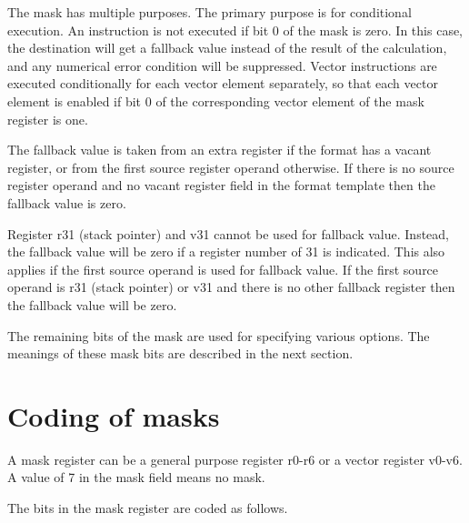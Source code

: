 \documentclass[forwardcom.tex]{subfiles}
\begin{document}
The mask has multiple purposes. The primary purpose is for conditional execution. An instruction is not executed if bit 0 of the mask is zero. In this case, the destination will get a fallback value instead of the result of the calculation, and any numerical error condition will be suppressed. Vector instructions are executed conditionally for each vector element separately, so that each vector element is enabled if bit 0 of the corresponding vector element of the mask register is one.
\vspace{2mm}

The fallback value is taken from an extra register if the format has a vacant register, or from the first source register operand otherwise. If there is no source register operand and no vacant register field in the format template then the fallback value is zero.
\vspace{2mm}

Register r31 (stack pointer) and v31 cannot be used for fallback value. Instead, the fallback value will be zero if a register number of 31 is indicated. This also applies if the first source operand is used for fallback value. If the first source operand is r31 (stack pointer) or v31 and there is no other fallback register then the fallback value will be zero.
\vspace{2mm}

The remaining bits of the mask are used for specifying various options.
The meanings of these mask bits are described in the next section.

\section{Coding of masks}
A mask register can be a general purpose register r0-r6 or a vector register v0-v6. A value of 7 in the mask field means no mask.
\vspace{2mm}

The bits in the mask register are coded as follows.
\end{document}
